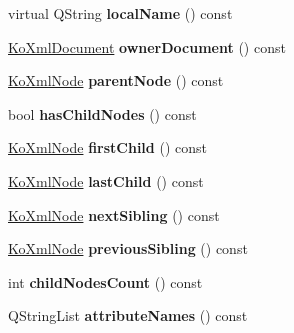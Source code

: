 \begin{DoxyCompactItemize}
\item 
\hypertarget{classKoXmlNode_a12a19b317412059a47df882f6e66c6af}{
virtual QString {\bfseries localName} () const }
\label{classKoXmlNode_a12a19b317412059a47df882f6e66c6af}

\item 
\hypertarget{classKoXmlNode_a5e7fa60afab968f744a5424da70699e4}{
\hyperlink{classKoXmlDocument}{KoXmlDocument} {\bfseries ownerDocument} () const }
\label{classKoXmlNode_a5e7fa60afab968f744a5424da70699e4}

\item 
\hypertarget{classKoXmlNode_a50fb2d47e886a098fb369009939d08ad}{
\hyperlink{classKoXmlNode}{KoXmlNode} {\bfseries parentNode} () const }
\label{classKoXmlNode_a50fb2d47e886a098fb369009939d08ad}

\item 
\hypertarget{classKoXmlNode_acaa00c62da8540db16ecbd54b953a1fc}{
bool {\bfseries hasChildNodes} () const }
\label{classKoXmlNode_acaa00c62da8540db16ecbd54b953a1fc}

\item 
\hypertarget{classKoXmlNode_a144685aade56a4ba964452de8fa6e6e4}{
\hyperlink{classKoXmlNode}{KoXmlNode} {\bfseries firstChild} () const }
\label{classKoXmlNode_a144685aade56a4ba964452de8fa6e6e4}

\item 
\hypertarget{classKoXmlNode_aea16e2bca4f13dc87872a6f5a39647b7}{
\hyperlink{classKoXmlNode}{KoXmlNode} {\bfseries lastChild} () const }
\label{classKoXmlNode_aea16e2bca4f13dc87872a6f5a39647b7}

\item 
\hypertarget{classKoXmlNode_a422d7bd0d5107a2e062a22ddccf0220a}{
\hyperlink{classKoXmlNode}{KoXmlNode} {\bfseries nextSibling} () const }
\label{classKoXmlNode_a422d7bd0d5107a2e062a22ddccf0220a}

\item 
\hypertarget{classKoXmlNode_a48e2e9b58a3a67307e6950476cb6dde5}{
\hyperlink{classKoXmlNode}{KoXmlNode} {\bfseries previousSibling} () const }
\label{classKoXmlNode_a48e2e9b58a3a67307e6950476cb6dde5}

\item 
\hypertarget{classKoXmlNode_afa7807761c17f1c4c49fae6d4702a3c6}{
int {\bfseries childNodesCount} () const }
\label{classKoXmlNode_afa7807761c17f1c4c49fae6d4702a3c6}

\item 
\hypertarget{classKoXmlNode_a4cbefc4c323ee9b422b568a141463feb}{
QStringList {\bfseries attributeNames} () const }
\label{classKoXmlNode_a4cbefc4c323ee9b422b568a141463feb}


\end{DoxyCompactItemize}
